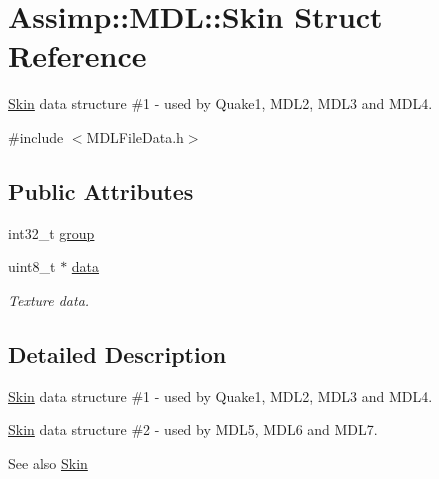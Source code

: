 \hypertarget{struct_assimp_1_1_m_d_l_1_1_skin}{\section{Assimp\+:\+:M\+D\+L\+:\+:Skin Struct Reference}
\label{struct_assimp_1_1_m_d_l_1_1_skin}
}


\hyperlink{struct_assimp_1_1_m_d_l_1_1_skin}{Skin} data structure \#1 -\/ used by Quake1, M\+D\+L2, M\+D\+L3 and M\+D\+L4.  




{\ttfamily \#include $<$M\+D\+L\+File\+Data.\+h$>$}

\subsection*{Public Attributes}
\begin{DoxyCompactItemize}
\item 
int32\+\_\+t \hyperlink{struct_assimp_1_1_m_d_l_1_1_skin_a8f6347c6a877b851466abd7d192bb75d}{group}
\item 
\hypertarget{struct_assimp_1_1_m_d_l_1_1_skin_ad98eacf1196e5a2b7d2ce743082616ff}{uint8\+\_\+t $\ast$ \hyperlink{struct_assimp_1_1_m_d_l_1_1_skin_ad98eacf1196e5a2b7d2ce743082616ff}{data}}\label{struct_assimp_1_1_m_d_l_1_1_skin_ad98eacf1196e5a2b7d2ce743082616ff}

\begin{DoxyCompactList}\small\item\em Texture data. \end{DoxyCompactList}\end{DoxyCompactItemize}


\subsection{Detailed Description}
\hyperlink{struct_assimp_1_1_m_d_l_1_1_skin}{Skin} data structure \#1 -\/ used by Quake1, M\+D\+L2, M\+D\+L3 and M\+D\+L4. 

\hyperlink{struct_assimp_1_1_m_d_l_1_1_skin}{Skin} data structure \#2 -\/ used by M\+D\+L5, M\+D\+L6 and M\+D\+L7.

\begin{DoxySeeAlso}{See also}
\hyperlink{struct_assimp_1_1_m_d_l_1_1_skin}{Skin} 
\end{DoxySeeAlso}



